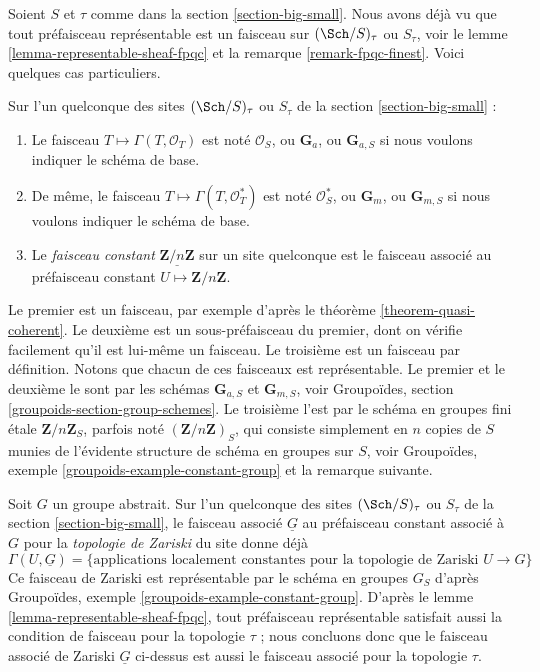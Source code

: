 \noindent
Soient $S$ et $\tau$ comme dans la section \ref{section-big-small}.
Nous avons d\'ej\`a vu que tout pr\'efaisceau repr\'esentable est un faisceau sur
$(\Sch/S)_\tau$ ou $S_\tau$, voir
le lemme \ref{lemma-representable-sheaf-fpqc}
et la
remarque \ref{remark-fpqc-finest}.
Voici quelques cas particuliers.

\begin{definition}
\label{definition-additive-sheaf}
Sur l'un quelconque des sites $(\Sch/S)_\tau$ ou $S_\tau$ de la
section \ref{section-big-small} :
\begin{enumerate}
\item Le faisceau $T \mapsto \Gamma(T, \mathcal{O}_T)$ est not\'e
$\mathcal{O}_S$, ou $\mathbf{G}_a$, ou $\mathbf{G}_{a, S}$ si nous
voulons indiquer le sch\'ema de base.
\item De m\^eme, le faisceau
$T \mapsto \Gamma(T, \mathcal{O}^*_T)$ est not\'e $\mathcal{O}_S^*$, ou
$\mathbf{G}_m$, ou $\mathbf{G}_{m, S}$ si nous voulons
indiquer le sch\'ema de base.
\item Le {\it faisceau constant} $\underline{\mathbf{Z}/n\mathbf{Z}}$ sur un
site quelconque est le faisceau associ\'e au pr\'efaisceau constant
$U \mapsto \mathbf{Z}/n\mathbf{Z}$.
\end{enumerate}
\end{definition}

\noindent
Le premier est un faisceau, par exemple d'apr\`es le
th\'eor\`eme \ref{theorem-quasi-coherent}.
Le deuxi\`eme est un sous-pr\'efaisceau du premier, dont on v\'erifie facilement
qu'il est lui-m\^eme un faisceau. Le troisi\`eme est un faisceau par d\'efinition.
Notons que chacun de ces faisceaux est repr\'esentable.
Le premier et le deuxi\`eme le sont par les sch\'emas $\mathbf{G}_{a, S}$ et
$\mathbf{G}_{m, S}$, voir
Groupoïdes, section \ref{groupoids-section-group-schemes}.
Le troisi\`eme l'est par le sch\'ema en groupes fini \'etale $\mathbf{Z}/n\mathbf{Z}_S$,
parfois not\'e $(\mathbf{Z}/n\mathbf{Z})_S$,
qui consiste simplement en $n$ copies de $S$ munies
de l'\'evidente structure de sch\'ema en groupes sur $S$, voir
Groupoïdes, exemple \ref{groupoids-example-constant-group}
et la remarque suivante.

\begin{remark}
\label{remark-constant-locally-constant-maps}
Soit $G$ un groupe abstrait.
Sur l'un quelconque des sites $(\Sch/S)_\tau$ ou $S_\tau$ de la
section \ref{section-big-small},
le faisceau associ\'e $\underline{G}$
au pr\'efaisceau constant associ\'e \`a $G$ pour la
{\it topologie de Zariski} du site donne d\'ej\`a
$$
\Gamma(U, \underline{G}) =
\{\text{applications localement constantes pour la topologie de Zariski }U \to G\}
$$
Ce faisceau de Zariski est repr\'esentable par le sch\'ema en groupes $G_S$ d'apr\`es
Groupoïdes, exemple \ref{groupoids-example-constant-group}.
D'apr\`es le
lemme \ref{lemma-representable-sheaf-fpqc},
tout pr\'efaisceau repr\'esentable satisfait aussi la condition de faisceau pour la
topologie $\tau$ ; nous concluons donc que le faisceau associ\'e de Zariski
$\underline{G}$ ci-dessus est aussi le faisceau associ\'e pour la topologie $\tau$.
\end{remark}

